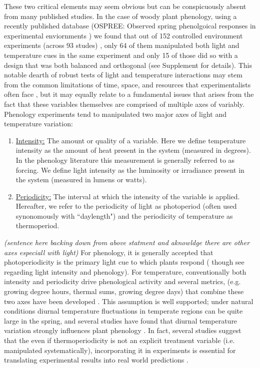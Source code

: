 \documentclass[11pt]{article}
\begin{document}
These two critical elements may seem obvious but can be conspicuously absent from many published studies. In the case of woody plant phenology, using a recently published database (OSPREE: Observed spring phenolgoical responses in experimental enviornments \citep{}) we found that out of 152 controlled environment experiments (across 93 studes) \citep{}, only 64 of them manipulated both light and temperature cues in the same experiment and only 15 of those did so with a design that was both balanced and orthogonal (see Supplement for details). This notable dearth of robust tests of light and temperature interactions may stem from the common limitations of time, space, and resources that experimentalists often face \citep{}, but it may equally relate to a fundamental issues that arises from the fact that these variables themselves are comprised of multiple axes of variably.\\
Phenology experiments tend to manipulated two major axes of light and temperature variation:
\begin{enumerate}
\item \underline{Intensity:} The amount or quality of a variable. Here we define temperature intensity as the amount of heat present in the system (measured in degrees).  In the phenology literature this measurement is generally referred to as forcing. We define light intensity as the luminosity or irradiance present in the system (measured in lumens or watts). 
\item \underline{Periodicity:} The interval at which the intensity of the variable is applied. Hereafter, we refer to the periodicity of light as photoperiod (often used synonomously with ``daylength") and the periodicity of temperature as thermoperiod. 
\end{enumerate}
\textit{(sentence here backing down from above statment and aknowldge there are other axes especiall with light)}
For phenology, it is generally accepted that photoperiodicity is the primary light cue to which plants respond (\citep{} though see \citep{} regarding light intensity and phenology). For temperature, conventionally both intensity and periodicity drive phenological activity \citep{} and several metrics, (e.g. growing degree hours, thermal sums, growing degree days)  that combine these two axes have been developed \citep{}. This assumption is well supported; under natural conditions diurnal temperature fluctuations in temperate regions can be quite large in the spring, and several studies have found that diurnal temperature variation strongly influences plant phenology \citep{}. In fact, several studies suggest that the even if thermoperiodicity is not an explicit treatment variable (i.e. manipulated systematically), incorporating it in experiments is essential for translating experimental results into real world predictions \citep{}.
\end{document}
